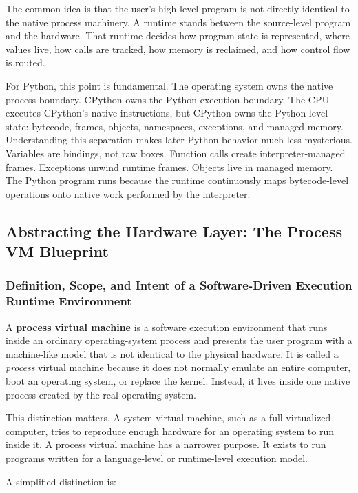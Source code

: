\documentclass[a4paper,twoside]{report}
\begin{document}
The common idea is that the user's high-level program is not directly identical to the native process machinery. A runtime stands between the source-level program and the hardware. That runtime decides how program state is represented, where values live, how calls are tracked, how memory is reclaimed, and how control flow is routed.

For Python, this point is fundamental. The operating system owns the native process boundary. CPython owns the Python execution boundary. The CPU executes CPython's native instructions, but CPython owns the Python-level state: bytecode, frames, objects, namespaces, exceptions, and managed memory. Understanding this separation makes later Python behavior much less mysterious. Variables are bindings, not raw boxes. Function calls create interpreter-managed frames. Exceptions unwind runtime frames. Objects live in managed memory. The Python program runs because the runtime continuously maps bytecode-level operations onto native work performed by the interpreter.


\subsection{Abstracting the Hardware Layer: The Process VM Blueprint}



\subsubsection{Definition, Scope, and Intent of a Software-Driven Execution Runtime Environment}

A \textbf{process virtual machine} is a software execution environment that runs inside an ordinary operating-system process and presents the user program with a machine-like model that is not identical to the physical hardware. It is called a \emph{process} virtual machine because it does not normally emulate an entire computer, boot an operating system, or replace the kernel. Instead, it lives inside one native process created by the real operating system.

This distinction matters. A system virtual machine, such as a full virtualized computer, tries to reproduce enough hardware for an operating system to run inside it. A process virtual machine has a narrower purpose. It exists to run programs written for a language-level or runtime-level execution model.

A simplified distinction is:
\end{document}
